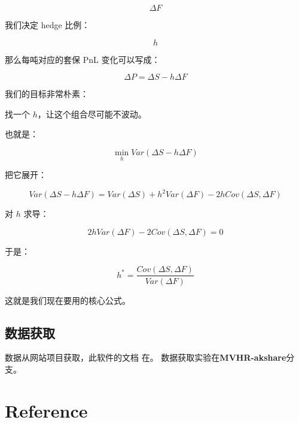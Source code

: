 $$
    \Delta F
$$

我们决定 hedge 比例：

$$
    h
$$

那么每吨对应的套保 PnL 变化可以写成：

$$
    \Delta P=\Delta S-h\Delta F
$$

我们的目标非常朴素：

找一个 $h$，让这个组合尽可能不波动。

也就是：

$$
    \min_h Var(\Delta S-h\Delta F)
$$

把它展开：

$$
    Var(\Delta S-h\Delta F)
    =
    Var(\Delta S)
    +h^2Var(\Delta F)
    -2hCov(\Delta S,\Delta F)
$$

对 $h$ 求导：

$$
    2hVar(\Delta F)
    -
    2Cov(\Delta S,\Delta F)
    =0
$$

于是：

$$
    \boxed{
        h^*
        =
        \frac{Cov(\Delta S,\Delta F)}
        {Var(\Delta F)}
    }
$$

这就是我们现在要用的核心公式。


\subsection{数据获取}
数据从网站项目获取\cite[akshare]{akshare}，此软件的文档
在\cite[doc]{akshare-doc}。
数据获取实验在\textbf{MVHR-akshare}分支。




\section{Reference}




